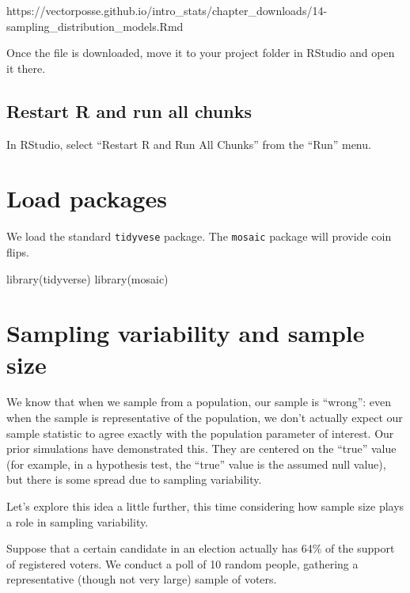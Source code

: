 \documentclass[
]{book}
\newenvironment{Shaded}{\begin{snugshade}}{\end{snugshade}}
\newcommand{\FunctionTok}[1]{\textcolor[rgb]{0.00,0.00,0.00}{#1}}
\newcommand{\NormalTok}[1]{#1}
\begin{document}
https://vectorposse.github.io/intro\_stats/chapter\_downloads/14-sampling\_distribution\_models.Rmd

Once the file is downloaded, move it to your project folder in RStudio and open it there.

\hypertarget{samp-dist-models-restart}{%
\subsection{Restart R and run all chunks}\label{samp-dist-models-restart}}

In RStudio, select ``Restart R and Run All Chunks'' from the ``Run'' menu.

\hypertarget{samp-dist-models-load}{%
\section{Load packages}\label{samp-dist-models-load}}

We load the standard \texttt{tidyvese} package. The \texttt{mosaic} package will provide coin flips.

\begin{Shaded}
\begin{Highlighting}[]
\FunctionTok{library}\NormalTok{(tidyverse)}
\FunctionTok{library}\NormalTok{(mosaic)}
\end{Highlighting}
\end{Shaded}

\hypertarget{samp-dist-models-sampling-variability}{%
\section{Sampling variability and sample size}\label{samp-dist-models-sampling-variability}}

We know that when we sample from a population, our sample is ``wrong'': even when the sample is representative of the population, we don't actually expect our sample statistic to agree exactly with the population parameter of interest. Our prior simulations have demonstrated this. They are centered on the ``true'' value (for example, in a hypothesis test, the ``true'' value is the assumed null value), but there is some spread due to sampling variability.

Let's explore this idea a little further, this time considering how sample size plays a role in sampling variability.

Suppose that a certain candidate in an election actually has 64\% of the support of registered voters. We conduct a poll of 10 random people, gathering a representative (though not very large) sample of voters.
\end{document}

